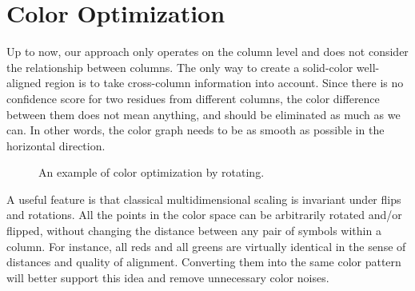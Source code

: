 \section{Color Optimization}

Up to now, our approach only operates on the column level and does not consider the relationship between columns. The only way to create a solid-color well-aligned region is to take cross-column information into account. Since there is no confidence score for two residues from different columns, the color difference between them does not mean anything, and should be eliminated as much as we can. In other words, the color graph needs to be as smooth as possible in the horizontal direction.

\begin{figure}[hbt]
\caption[Color Optimization by Rotation]{An example of color optimization by rotating.}\label{fig:chap2_rotate}
\end{figure}

A useful feature is that classical multidimensional scaling is invariant under flips and rotations. All the points in the color space can be arbitrarily rotated and/or flipped, without changing the distance between any pair of symbols within a column. For instance, all reds and all greens are virtually identical in the sense of distances and quality of alignment. Converting them into the same color pattern will better support this idea and remove unnecessary color noises.


